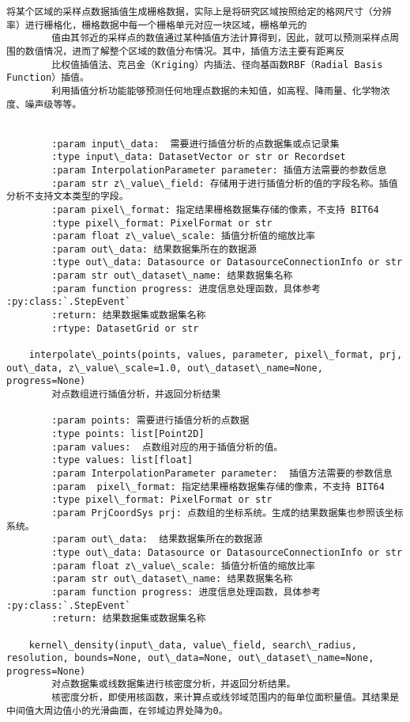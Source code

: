 \documentclass[11pt]{article}
\begin{document}
\begin{Verbatim}[commandchars=\\\{\}]
        将某个区域的采样点数据插值生成栅格数据，实际上是将研究区域按照给定的格网尺寸（分辨率）进行栅格化，栅格数据中每一个栅格单元对应一块区域，栅格单元的
        值由其邻近的采样点的数值通过某种插值方法计算得到，因此，就可以预测采样点周围的数值情况，进而了解整个区域的数值分布情况。其中，插值方法主要有距离反
        比权值插值法、克吕金（Kriging）内插法、径向基函数RBF（Radial Basis Function）插值。
        利用插值分析功能能够预测任何地理点数据的未知值，如高程、降雨量、化学物浓度、噪声级等等。
        
        
        :param input\_data:  需要进行插值分析的点数据集或点记录集
        :type input\_data: DatasetVector or str or Recordset
        :param InterpolationParameter parameter: 插值方法需要的参数信息
        :param str z\_value\_field: 存储用于进行插值分析的值的字段名称。插值分析不支持文本类型的字段。
        :param pixel\_format: 指定结果栅格数据集存储的像素，不支持 BIT64
        :type pixel\_format: PixelFormat or str
        :param float z\_value\_scale: 插值分析值的缩放比率
        :param out\_data: 结果数据集所在的数据源
        :type out\_data: Datasource or DatasourceConnectionInfo or str
        :param str out\_dataset\_name: 结果数据集名称
        :param function progress: 进度信息处理函数，具体参考 :py:class:`.StepEvent`
        :return: 结果数据集或数据集名称
        :rtype: DatasetGrid or str
    
    interpolate\_points(points, values, parameter, pixel\_format, prj, out\_data, z\_value\_scale=1.0, out\_dataset\_name=None, progress=None)
        对点数组进行插值分析，并返回分析结果
        
        :param points: 需要进行插值分析的点数据
        :type points: list[Point2D]
        :param values:  点数组对应的用于插值分析的值。
        :type values: list[float]
        :param InterpolationParameter parameter:  插值方法需要的参数信息
        :param  pixel\_format: 指定结果栅格数据集存储的像素，不支持 BIT64
        :type pixel\_format: PixelFormat or str
        :param PrjCoordSys prj: 点数组的坐标系统。生成的结果数据集也参照该坐标系统。
        :param out\_data:  结果数据集所在的数据源
        :type out\_data: Datasource or DatasourceConnectionInfo or str
        :param float z\_value\_scale: 插值分析值的缩放比率
        :param str out\_dataset\_name: 结果数据集名称
        :param function progress: 进度信息处理函数，具体参考 :py:class:`.StepEvent`
        :return: 结果数据集或数据集名称
    
    kernel\_density(input\_data, value\_field, search\_radius, resolution, bounds=None, out\_data=None, out\_dataset\_name=None, progress=None)
        对点数据集或线数据集进行核密度分析，并返回分析结果。
        核密度分析，即使用核函数，来计算点或线邻域范围内的每单位面积量值。其结果是中间值大周边值小的光滑曲面，在邻域边界处降为0。
        

\end{Verbatim}
\end{document}
